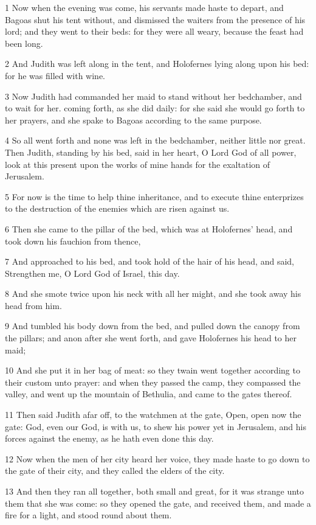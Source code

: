 \par 1 Now when the evening was come, his servants made haste to depart, and Bagoas shut his tent without, and dismissed the waiters from the presence of his lord; and they went to their beds: for they were all weary, because the feast had been long.
\par 2 And Judith was left along in the tent, and Holofernes lying along upon his bed: for he was filled with wine.
\par 3 Now Judith had commanded her maid to stand without her bedchamber, and to wait for her. coming forth, as she did daily: for she said she would go forth to her prayers, and she spake to Bagoas according to the same purpose.
\par 4 So all went forth and none was left in the bedchamber, neither little nor great. Then Judith, standing by his bed, said in her heart, O Lord God of all power, look at this present upon the works of mine hands for the exaltation of Jerusalem.
\par 5 For now is the time to help thine inheritance, and to execute thine enterprizes to the destruction of the enemies which are risen against us.
\par 6 Then she came to the pillar of the bed, which was at Holofernes' head, and took down his fauchion from thence,
\par 7 And approached to his bed, and took hold of the hair of his head, and said, Strengthen me, O Lord God of Israel, this day.
\par 8 And she smote twice upon his neck with all her might, and she took away his head from him.
\par 9 And tumbled his body down from the bed, and pulled down the canopy from the pillars; and anon after she went forth, and gave Holofernes his head to her maid;
\par 10 And she put it in her bag of meat: so they twain went together according to their custom unto prayer: and when they passed the camp, they compassed the valley, and went up the mountain of Bethulia, and came to the gates thereof.
\par 11 Then said Judith afar off, to the watchmen at the gate, Open, open now the gate: God, even our God, is with us, to shew his power yet in Jerusalem, and his forces against the enemy, as he hath even done this day.
\par 12 Now when the men of her city heard her voice, they made haste to go down to the gate of their city, and they called the elders of the city.
\par 13 And then they ran all together, both small and great, for it was strange unto them that she was come: so they opened the gate, and received them, and made a fire for a light, and stood round about them.
